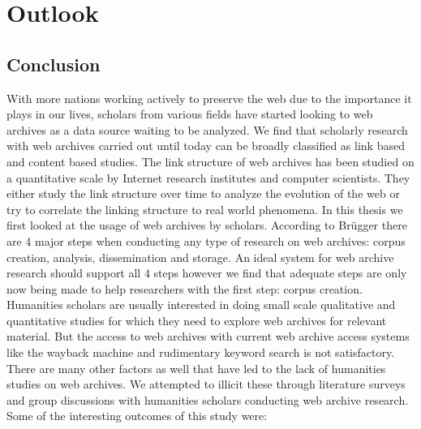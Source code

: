 \chapter{Outlook} %
\label{cha:conclusion_and_future_work}


\section{Conclusion}
\vspace{-2mm}
With more nations working actively to preserve the web due to the importance it plays in our lives, scholars from various fields have started looking to web archives as a data source waiting to be analyzed. We find that scholarly research with web archives carried out until today can be broadly classified as link based and content based studies. The link structure of web archives has been studied on a quantitative scale by Internet research institutes and computer scientists. They either study the link structure over time to analyze the evolution of the web or try to correlate the linking structure to real world phenomena. In this thesis we first looked at the usage of web archives by scholars. According to Br\"ugger there are 4 major steps when conducting any type of research on web archives: corpus creation, analysis, dissemination and storage. An ideal system for web archive research should support all 4 steps however we find that adequate steps are only now being made to help researchers with the first step: corpus creation. Humanities scholars are usually interested in doing small scale qualitative and quantitative studies for which they need to explore web archives for relevant material. But the access to web archives with current web archive access systems like the wayback machine and rudimentary keyword search is not satisfactory. There are many other factors as well that have led to the lack of humanities studies on web archives. We attempted to illicit these through literature surveys and group discussions with humanities scholars conducting web archive research. Some of the interesting outcomes of this study were:

